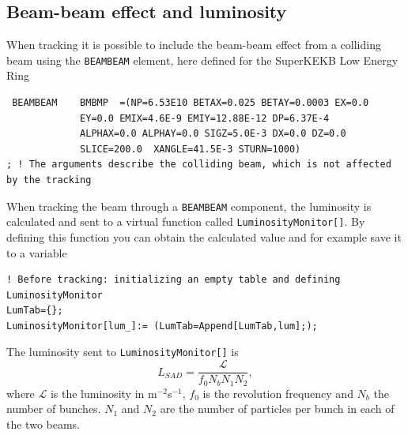 \documentclass{article}
\begin{document}
\subsection{Beam-beam effect and luminosity}
When tracking it is possible to include the beam-beam effect from a colliding beam using the \texttt{BEAMBEAM} element, here defined for the SuperKEKB Low Energy Ring
\begin{lstlisting}
 BEAMBEAM    BMBMP  =(NP=6.53E10 BETAX=0.025 BETAY=0.0003 EX=0.0
             EY=0.0 EMIX=4.6E-9 EMIY=12.88E-12 DP=6.37E-4 
             ALPHAX=0.0 ALPHAY=0.0 SIGZ=5.0E-3 DX=0.0 DZ=0.0
             SLICE=200.0  XANGLE=41.5E-3 STURN=1000)
; ! The arguments describe the colliding beam, which is not affected by the tracking
\end{lstlisting}
When tracking the beam through a \texttt{BEAMBEAM} component, the luminosity is calculated and sent to a virtual function called \texttt{LuminosityMonitor[]}. By defining this function you can obtain the calculated value and for example save it to a variable 
\begin{lstlisting}
! Before tracking: initializing an empty table and defining LuminosityMonitor
LumTab={};
LuminosityMonitor[lum_]:= (LumTab=Append[LumTab,lum];);
\end{lstlisting}
The luminosity sent to \texttt{LuminosityMonitor[]} is
\begin{equation*}
L_{SAD}=\frac{\mathcal{L}}{f_0N_bN_1N_2},
\end{equation*}
where $\mathcal{L}$ is the luminosity in m$^{-2}$s$^{-1}$, $f_0$ is the revolution frequency and $N_b$ the number of bunches. $N_1$ and $N_2$ are the number of particles per bunch in each of the two beams.



\end{document}

